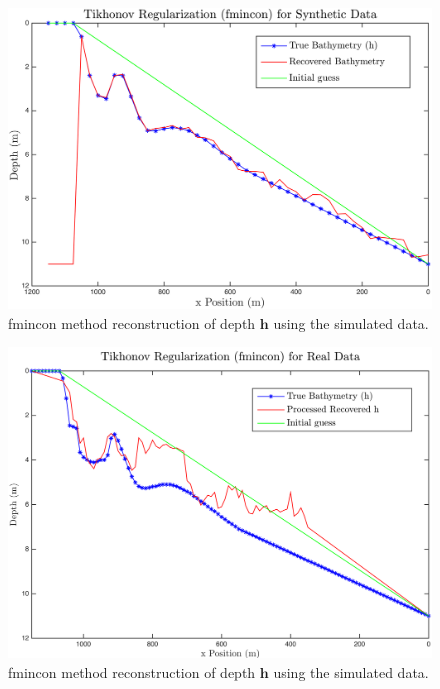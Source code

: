 \begin{figure}[H]
\center
\includegraphics[scale=0.47]{img/fmincon_simulated_25_new.png} %
\caption{fmincon method reconstruction of depth $\mathbf{h}$ using the simulated data.}
\label{fmincon_simulated}
\end{figure}

\begin{figure}[H]
\center
\includegraphics[scale=0.46]{img/fmincon_real_data_oct09.png} %
\caption{fmincon method reconstruction of depth $\mathbf{h}$ using the simulated data.}
\label{fmincon_simulated}
\end{figure}


